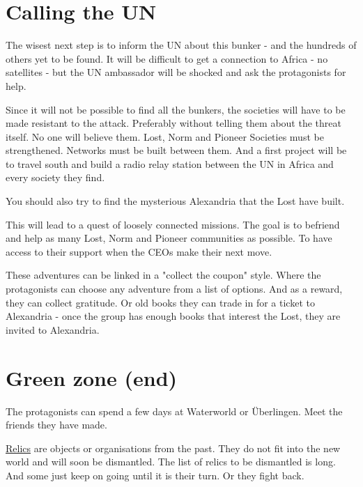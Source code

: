 \section{Calling the UN}

The wisest next step is to inform the UN about this bunker - and the hundreds of others yet to be found. It will be difficult to get a connection to Africa - no satellites - but the UN ambassador will be shocked and ask the protagonists for help.

Since it will not be possible to find all the bunkers, the societies will have to be made resistant to the attack. Preferably without telling them about the threat itself. No one will believe them. Lost, Norm and Pioneer Societies must be strengthened. Networks must be built between them. And a first project will be to travel south and build a radio relay station between the UN in Africa and every society they find.

You should also try to find the mysterious Alexandria that the Lost have built.

This will lead to a quest of loosely connected missions. The goal is to befriend and help as many Lost, Norm and Pioneer communities as possible. To have access to their support when the CEOs make their next move.

These adventures can be linked in a "collect the coupon" style. Where the protagonists can choose any adventure from a list of options. And as a reward, they can collect gratitude. Or old books they can trade in for a ticket to Alexandria - once the group has enough books that interest the Lost, they are invited to Alexandria.

\section{Green zone (end)}

The protagonists can spend a few days at Waterworld or Überlingen. Meet the friends they have made.













\begin{sidebarBox}[title=Relics]
\hyperref[sec:Relic]{Relics} are objects or organisations from the past. They do not fit into the new world and will soon be dismantled. The list of relics to be dismantled is long. And some just keep on going until it is their turn. Or they fight back.
\end{sidebarBox}




\label{ch:Label name}

